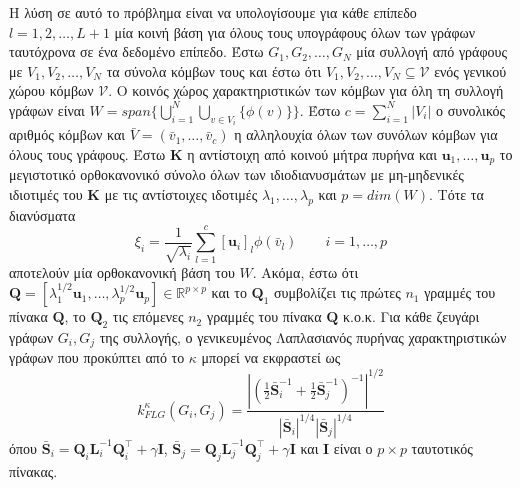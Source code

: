 Η λύση σε αυτό το πρόβλημα είναι να υπολογίσουμε για κάθε επίπεδο $l=1,2,\ldots,L+1$ μία κοινή βάση για όλους τους υπογράφους όλων των γράφων ταυτόχρονα σε ένα δεδομένο επίπεδο.
Έστω $G_1, G_2, \ldots, G_N$ μία συλλογή από γράφους με $V_1, V_2, \ldots, V_N$ τα σύνολα κόμβων τους και έστω ότι $V_1, V_2, \ldots, V_N \subseteq \mathcal{V}$ ενός γενικού χώρου κόμβων $\mathcal{V}$.
Ο κοινός χώρος χαρακτηριστικών των κόμβων για όλη τη συλλογή γράφων είναι $W = span \big\{ \bigcup_{i=1}^N \bigcup_{v \in V_i} \{ \phi(v) \} \big\}$.
Έστω $c = \sum_{i=1}^N |V_i|$ ο συνολικός αριθμός κόμβων και $\bar{V} = (\bar{v}_1, \ldots, \bar{v}_c)$ η αλληλουχία όλων των συνόλων κόμβων για όλους τους γράφους.
Έστω $\mathbf{K}$ η αντίστοιχη από κοινού μήτρα πυρήνα και $\mathbf{u}_1, \ldots, \mathbf{u}_p$ το μεγιστοτικό ορθοκανονικό σύνολο όλων των ιδιοδιανυσμάτων με μη-μηδενικές ιδιοτιμές του $\mathbf{K}$ με τις αντίστοιχες ιδοτιμές $\lambda_1,\ldots,\lambda_p$ και $p=dim(W)$.
Τότε τα διανύσματα
\begin{equation*}
    \xi_i = \frac{1}{\sqrt{\lambda_i}} \sum_{l=1}^c [\mathbf{u}_i]_l \phi(\bar{v}_l) \qquad i=1,\ldots,p
\end{equation*}
αποτελούν μία ορθοκανονική βάση του $W$.
Ακόμα, έστω ότι $\mathbf{Q} = [ \lambda_1^{1/2} \mathbf{u}_1, \ldots, \lambda_p^{1/2} \mathbf{u}_p ] \in \mathbb{R}^{p \times p}$ και το $\mathbf{Q}_1$ συμβολίζει τις πρώτες $n_1$ γραμμές του πίνακα $\mathbf{Q}$, το $\mathbf{Q}_2$ τις επόμενες $n_2 $ γραμμές του πίνακα $\mathbf{Q}$ κ.ο.κ.
Για κάθε ζευγάρι γράφων $G_i, G_j$ της συλλογής, ο γενικευμένος Λαπλασιανός πυρήνας χαρακτηριστικών γράφων που προκύπτει από το $\kappa$ μπορεί να εκφραστεί ως
\begin{equation*}
    k_{FLG}^\kappa(G_i, G_j) = \frac{| (\frac{1}{2} \bar{\mathbf{S}}_i^{-1} + \frac{1}{2} \bar{\mathbf{S}}_j^{-1} )^{-1} |^{1/2}}{|\bar{\mathbf{S}}_i|^{1/4} |\bar{\mathbf{S}}_j|^{1/4}} 
\end{equation*}
όπου $\bar{\mathbf{S}}_i = \mathbf{Q}_i \mathbf{L}_i^{-1} \mathbf{Q}_i^\top + \gamma \mathbf{I}$, $\bar{\mathbf{S}}_j = \mathbf{Q}_j \mathbf{L}_j^{-1} \mathbf{Q}_j^\top + \gamma \mathbf{I}$ και $\mathbf{I}$ είναι ο $p \times p$ ταυτοτικός πίνακας.

